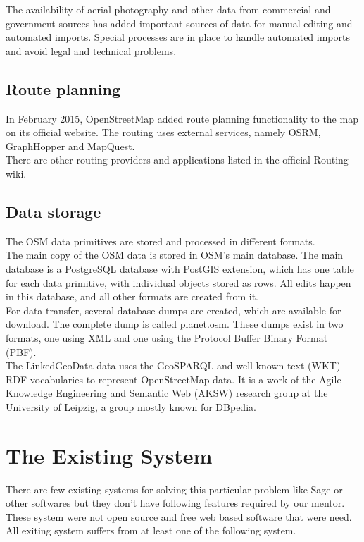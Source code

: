 The availability of aerial photography and other data from commercial and government sources has added important sources of data for manual editing and automated imports. Special processes are in place to handle automated imports and avoid legal and technical problems.
\subsection{ Route planning}

In February 2015, OpenStreetMap added route planning functionality to the map on its official website. The routing uses external services, namely OSRM, GraphHopper and MapQuest.\\

There are other routing providers and applications listed in the official Routing wiki.

\subsection{Data storage}
The OSM data primitives are stored and processed in different formats.\\

The main copy of the OSM data is stored in OSM's main database. The main database is a PostgreSQL database with PostGIS extension, which has one table for each data primitive, with individual objects stored as rows. All edits happen in this database, and all other formats are created from it.\\

For data transfer, several database dumps are created, which are available for download. The complete dump is called planet.osm. These dumps exist in two formats, one using XML and one using the Protocol Buffer Binary Format (PBF).\\

The LinkedGeoData data uses the GeoSPARQL and well-known text (WKT) RDF vocabularies to represent OpenStreetMap data. It is a work of the Agile Knowledge Engineering and Semantic Web (AKSW) research group at the University of Leipzig, a group mostly known for DBpedia.


\section{The Existing System}
There are few existing systems for solving this particular problem like Sage or other softwares but
they don’t have following features required by our mentor. These system were not open source
and free web based software that were need.
All exiting system suffers from at least one of the following system.
